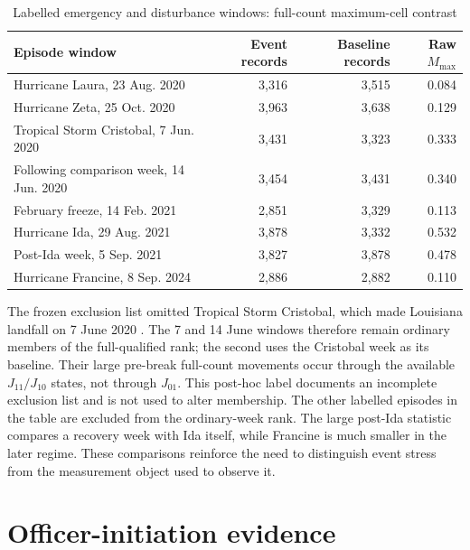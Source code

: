\documentclass[11pt]{article}
\begin{document}
\begin{table}[t]
\centering
\caption{Labelled emergency and disturbance windows: full-count maximum-cell contrast}
\label{tab:episodes}
\begin{tabular}{@{}lrrr@{}}
\toprule
Episode window & Event records & Baseline records & Raw $M_{\max}$ \\
\midrule
Hurricane Laura, 23 Aug. 2020 & 3,316 & 3,515 & 0.084 \\
Hurricane Zeta, 25 Oct. 2020 & 3,963 & 3,638 & 0.129 \\
Tropical Storm Cristobal, 7 Jun. 2020 & 3,431 & 3,323 & 0.333 \\
Following comparison week, 14 Jun. 2020 & 3,454 & 3,431 & 0.340 \\
February freeze, 14 Feb. 2021 & 2,851 & 3,329 & 0.113 \\
Hurricane Ida, 29 Aug. 2021 & 3,878 & 3,332 & 0.532 \\
Post-Ida week, 5 Sep. 2021 & 3,827 & 3,878 & 0.478 \\
Hurricane Francine, 8 Sep. 2024 & 2,886 & 2,882 & 0.110 \\
\bottomrule
\end{tabular}
\end{table}

The frozen exclusion list omitted Tropical Storm Cristobal, which made Louisiana landfall on 7 June 2020 \citep{NHC2020Cristobal}. The 7 and 14 June windows therefore remain ordinary members of the full-qualified rank; the second uses the Cristobal week as its baseline. Their large pre-break full-count movements occur through the available $J_{11}/J_{10}$ states, not through $J_{01}$. This post-hoc label documents an incomplete exclusion list and is not used to alter membership. The other labelled episodes in the table are excluded from the ordinary-week rank. The large post-Ida statistic compares a recovery week with Ida itself, while Francine is much smaller in the later regime. These comparisons reinforce the need to distinguish event stress from the measurement object used to observe it.

\section{Officer-initiation evidence}
\end{document}
